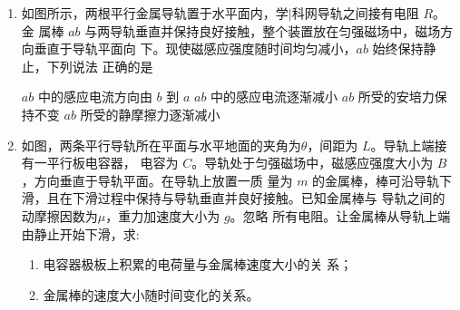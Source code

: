 \begin{enumerate}
\item 
{}
如图所示，两根平行金属导轨置于水平面内，学$ | $科网导轨之间接有电阻 $ R $。金
属棒 $ ab $ 与两导轨垂直并保持良好接触，整个装置放在匀强磁场中，磁场方向垂直于导轨平面向
下。现使磁感应强度随时间均匀减小，$ ab $ 始终保持静止，下列说法
正确的是  
\begin{figure}[h!]
\centering

\end{figure}


\fourchoices
{$ ab $ 中的感应电流方向由 $ b $ 到 $ a $}
{$ ab $ 中的感应电流逐渐减小}
{$ ab $ 所受的安培力保持不变}
{$ ab $ 所受的静摩擦力逐渐减小}


\item 
{}
如图，两条平行导轨所在平面与水平地面的夹角为$ \theta $，间距为 $ L $。导轨上端接有一平行板电容器，
电容为 $ C $。导轨处于匀强磁场中，磁感应强度大小为 $ B $，方向垂直于导轨平面。在导轨上放置一质
量为 $ m $ 的金属棒，棒可沿导轨下滑，且在下滑过程中保持与导轨垂直并良好接触。已知金属棒与
导轨之间的动摩擦因数为$ \mu $，重力加速度大小为 $ g $。忽略
所有电阻。让金属棒从导轨上端由静止开始下滑，求:
\begin{enumerate}
\item
电容器极板上积累的电荷量与金属棒速度大小的关
系；


\item 
金属棒的速度大小随时间变化的关系。


\end{enumerate}
\begin{figure}[h!]
\flushright

\end{figure}




\end{enumerate}
